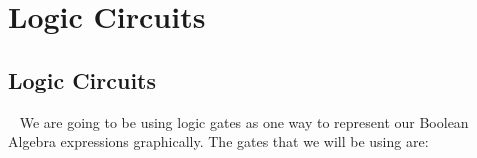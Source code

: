 \documentclass[a4paper,12pt]{book}
\title{}
\author{Rachel Morris}
\date{\today}
\begin{document}
    \togglefalse{answerkey}


    \section{Logic Circuits}

    \subsection{Logic Circuits}

    \begin{intro}{\ }
        We are going to be using logic gates as one way to represent our
        Boolean Algebra expressions graphically. The gates that we will be using are:


\end{intro}
\end{document}
